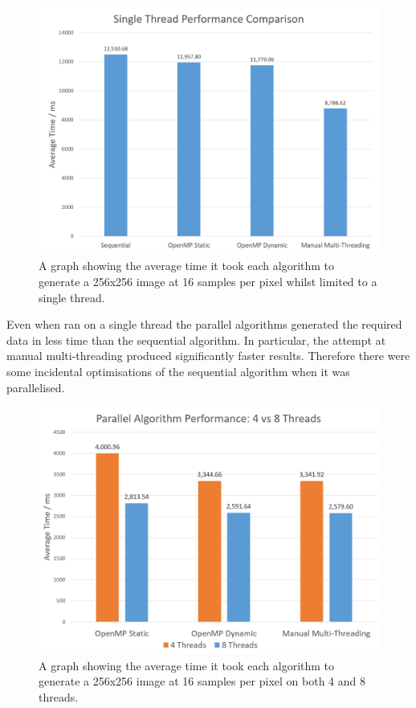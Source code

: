 \documentclass[journal,transmag]{IEEEtran}
\begin{document}
	\begin{figure}[!h]
		\centering
		\includegraphics[width=\columnwidth]{IMAGES/singlethreadperformance}
		\caption{A graph showing the average time it took each algorithm to generate a 256x256 image at 16 samples per pixel whilst limited to a single thread.}
		\label{graph3}
	\end{figure}

	Even when ran on a single thread the parallel algorithms generated the required data in less time than the sequential algorithm. In particular, the attempt at manual multi-threading produced significantly faster results. Therefore there were some incidental optimisations of the sequential algorithm when it was parallelised.

	\begin{figure}[!h]
		\centering
		\includegraphics[width=\columnwidth]{IMAGES/threadcomparison}
		\caption{A graph showing the average time it took each algorithm to generate a 256x256 image at 16 samples per pixel on both 4 and 8 threads.}
		\label{graph4}
	\end{figure}
\end{document}
